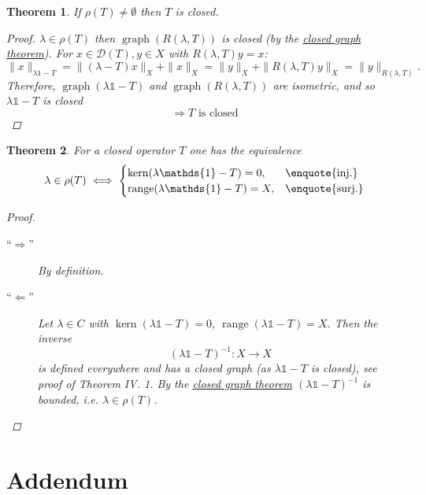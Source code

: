 \documentclass[12pt]{extreport} %
\newcommand{\DO}[1]{\mathcal{D}\left( {#1} \right)}
\theoremstyle{named}
\theoremstyle{nnamed}
\theoremstyle{itshape}
\newtheorem{theorem}{Theorem}  \counterwithin{theorem}{chapter}
\theoremstyle{normal}
\begin{document}
\begin{theorem}
	If $\rho(T) \neq \emptyset$ then $T$ is closed.
	
	\begin{proof}
		$\lambda \in \rho(T)$ then $\operatorname{graph}(R(\lambda, T))$ is closed (by the \hyperref[thm:a.cgt]{closed graph theorem}). For $x \in \DO{T}, y \in X$ with $R(\lambda, T) y = x$:
		$$ \| x \|_{\lambda \mathds{1} - T} = \| (\lambda - T) x \|_X + \| x \|_X = \| y \|_X + \| R(\lambda, T) y \|_X = \| y \|_{R(\lambda, T)}. $$
		Therefore, $\operatorname{graph}(\lambda \mathds{1} - T)$ and $\operatorname{graph}(R(\lambda, T))$ are isometric, and so $\lambda \mathds{1} - T$ is closed 
		$$ \Rightarrow T \text{ is closed} $$
	\end{proof}	
\end{theorem}

\begin{theorem}
	For a closed operator $T$ one has the equivalence
	$$ \lambda \in \rho(T) \iff \begin{cases} \operatorname{kern}(\lambda \mathds{1} - T) = 0, & \text{\enquote{inj.}} \\ \operatorname{range}(\lambda \mathds{1} - T) = X, & \text{\enquote{surj.}}\end{cases} $$
	
	\begin{proof} ~\
		\begin{description}
			\item[\hspace{0.25cm}\enquote{$\Rightarrow$}] By definition.
			\item[\hspace{0.25cm}\enquote{$\Leftarrow$}] Let $\lambda \in C$ with $\operatorname{kern}(\lambda \mathds{1} - T) = 0$, $\operatorname{range}(\lambda \mathds{1} - T) = X$. Then the inverse
			$$ \left( \lambda \mathds{1} - T \right)^{-1} \colon X \rightarrow X $$
			is defined everywhere and has a closed graph (as $\lambda \mathds{1} - T$ is closed), see proof of Theorem IV. 1. By the \hyperref[thm:acgt]{closed graph theorem} $\left( \lambda \mathds{1} - T \right)^{-1}$ is bounded, i.e. $\lambda \in \rho(T)$. 
		\end{description}
	\end{proof}
\end{theorem}

\appendix

\chapter*{Addendum}
\end{document}
